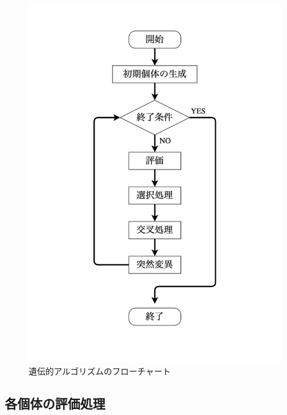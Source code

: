 \begin{figure}[p]
\begin{center}

\vspace{1.5cm}
\includegraphics[scale=0.75]{figurefolder/chapter2/GaFlowchart.pdf}
\caption{遺伝的アルゴリズムのフローチャート}
\label{遺伝的アルゴリズムのフローチャート}

\end{center}
\end{figure}

\clearpage


\subsection{各個体の評価処理}
\label{sec2.1.2}
  
